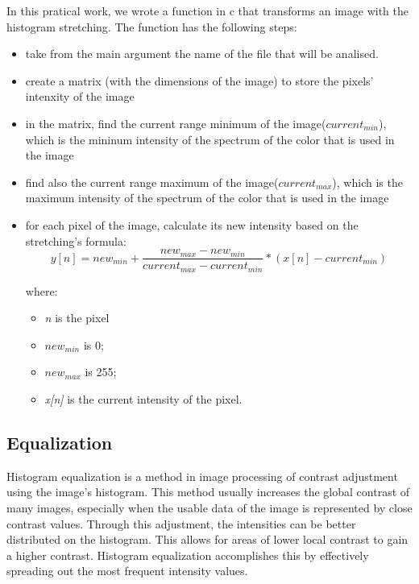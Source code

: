 \documentclass{report}
\begin{document}
	In this pratical work, we wrote a function in c that transforms an image with the histogram stretching. The function has the following steps:
	\begin{itemize}
  		\item take from the main argument the name of the file that will be analised.
  		\item create a matrix (with the dimensions of the image) to store the pixels' intenxity of the image
  		\item in the matrix, find the current range minimum of the image({\it $current_{min}$}), which is the mininum intensity of the spectrum of the color 			that is used in the image
  		\item find also the current range maximum of the image({\it $current_{max}$}), which is the maximum intensity of the spectrum of the color that is 			used in the image
  		\item for each pixel of the image, calculate its new intensity based on the stretching's formula:
		\begin{equation}
			y[n]=new_{min}+\frac{new_{max}-new_{min}}{current_{max}-current_{min}}*(x[n]-current_{min})
			\label{eq:stretching}
		\end{equation}
	
		where: 
			\begin{itemize}
	  			\item {\it n} is the pixel		
	  			\item {\it $new_{min}$} is 0;
	  			\item {\it $new_{max}$} is 255; 
	  			\item {\it x[n]} is the current intensity of the pixel.
			\end{itemize}
	\end{itemize}

	\subsection{Equalization}

	Histogram equalization is a method in image processing of contrast adjustment using the image's histogram. This method usually increases the global contrast 		of many images, especially when the usable data of the image is represented by close contrast values. Through this adjustment, the intensities can be better 		distributed on the histogram. This allows for areas of lower local contrast to gain a higher contrast. Histogram equalization accomplishes this by 		effectively spreading out the most frequent intensity values.
\end{document}
